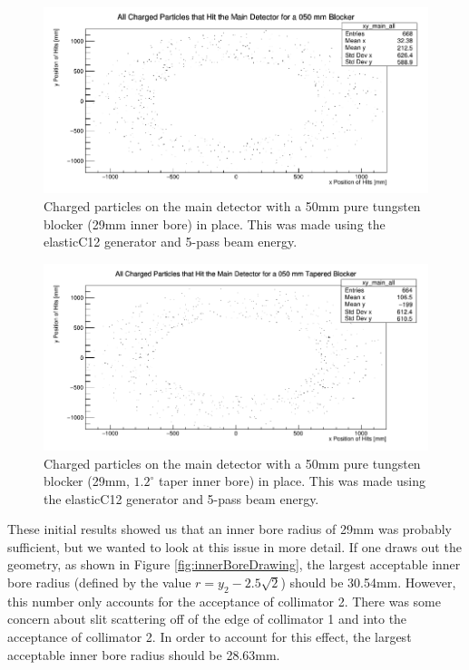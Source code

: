 \begin{figure}[H]
    \centering
    \includegraphics[scale=0.75]{Images/LessThan35mmWithNOTaperInnerHoleCPMainDet_12012021.png}
    \caption{Charged particles on the main detector with a 50mm pure tungsten blocker (29mm inner bore) in place. This was made using the elasticC12 generator and 5-pass beam energy.}
    \label{fig:blocker_50mmthick_29mminnerbore_notaper}
\end{figure}

\begin{figure}[H]
    \centering
    \includegraphics[scale=0.75]{Images/LessThan35mmWithTaperInnerHoleCPMainDet_12012021.png}
    \caption{Charged particles on the main detector with a 50mm pure tungsten blocker (29mm, $1.2^{\circ}$ taper inner bore) in place. This was made using the elasticC12 generator and 5-pass beam energy.}
    \label{fig:blocker_50mmthick_29mminnerbore_taper}
\end{figure}

These initial results showed us that an inner bore radius of 29mm was probably sufficient, but we wanted to look at this issue in more detail. If one draws out the geometry, as shown in Figure \ref{fig:innerBoreDrawing}, the largest acceptable inner bore radius (defined by the value $r=y_2-2.5\sqrt{2}$) should be 30.54mm. However, this number only accounts for the acceptance of collimator 2. There was some concern about slit scattering off of the edge of collimator 1 and into the acceptance of collimator 2. In order to account for this effect, the largest acceptable inner bore radius should be 28.63mm.

